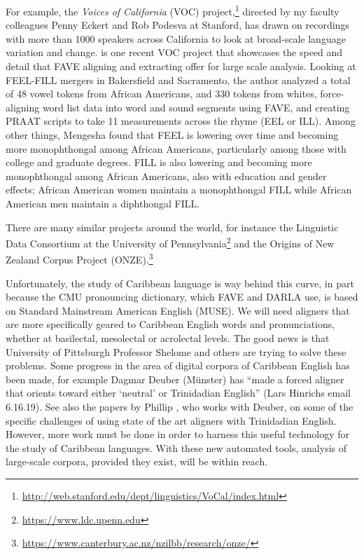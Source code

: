 \documentclass[output=paper,colorlinks,citecolor=brown]{langscibook}
\begin{document}
For example, the \textit{Voices of California} (VOC) project,\footnote{\url{http://web.stanford.edu/dept/linguistics/VoCal/index.html}} directed by my faculty colleagues Penny Eckert and Rob Podesva at Stanford, has drawn on recordings with more than 1000 speakers across California to look at broad-scale language variation and change.  \citet{Mengesha2020} is one recent VOC project that showcases the speed and detail that FAVE aligning and extracting offer for large scale analysis.   Looking at FEEL-FILL mergers in Bakersfield and Sacramento, the author analyzed a total of 48 vowel tokens from African Americans, and 330 tokens from whites, force-aligning word list data into word and sound segments using FAVE, and creating PRAAT scripts to take 11 measurements across the rhyme (EEL or ILL).  Among other things, Mengesha found that FEEL is lowering over time  and becoming more monophthongal among African Americans, particularly among those with college  and graduate degrees.  FILL is also lowering and becoming more monophthongal among African Americans, also with education and gender effects; African American women maintain a monophthongal FILL while African American men maintain a diphthongal FILL. 

There are many similar projects around the world, for instance the Linguistic Data Consortium at the University of Pennsylvania\footnote{\url{https://www.ldc.upenn.edu}} and the Origins of New Zealand Corpus Project (ONZE).\footnote{\url{https://www.canterbury.ac.nz/nzilbb/research/onze/}}


Unfortunately, the study of Caribbean language is way behind this curve, in part because the CMU pronouncing dictionary, which FAVE and DARLA use, is based on Standard Mainstream American English (MUSE).  We will need aligners that are more specifically geared to Caribbean English words and pronunciations, whether at basilectal, mesolectal or acrolectal levels.  The good news is that University of Pittsburgh Professor Shelome \citet{Gooden2019} and others are trying to solve these problems.  Some progress in the area of digital corpora of Caribbean English has been made, for example Dagmar Deuber (Münster) has “made a forced aligner that orients toward either ‘neutral’ or Trinidadian English” (Lars Hinrichs email 6.16.19).  See also the papers by Phillip \citet{Meer2019, Meer2020}, who works with Deuber, on some of the specific challenges of using state of the art aligners with Trinidadian English.  However, more work must be done in order to harness this useful technology for the study of Caribbean languages.  With these new automated tools, analysis of large-scale corpora, provided they exist, will be within reach. 
\end{document}

